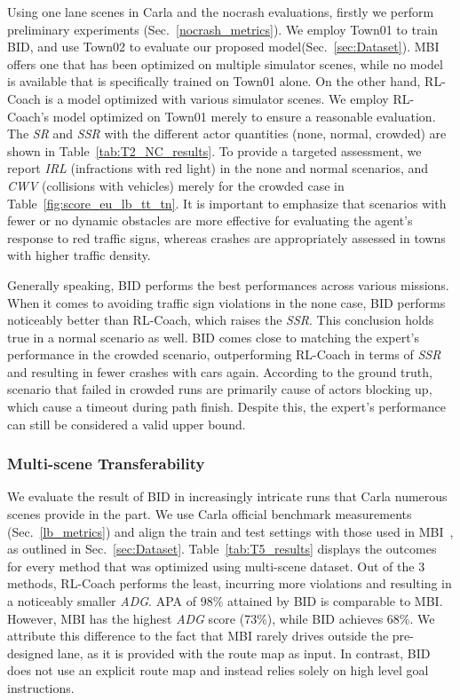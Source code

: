 \hspace{1pc}Using one lane scenes in Carla and  the nocrash evaluations, firstly we perform preliminary experiments (Sec.~\ref{nocrash_metrics}). 
We employ Town01 to train BID, and use Town02 to evaluate our proposed model(Sec.~\ref{sec:Dataset}). 
MBI offers one that has been optimized on multiple simulator scenes, while no model is available that is specifically trained on Town01 alone. 
On the other hand, RL-Coach is a model optimized with various simulator scenes. 
We employ RL-Coach's model optimized on Town01 merely to ensure a reasonable evaluation. 
The \emph{SR} and \emph{SSR} with the different actor quantities (none, normal, crowded) are shown in Table~\ref{tab:T2_NC_results}. 
To provide a targeted assessment, we report \emph{IRL} (infractions with red light) in the none and normal scenarios, and \emph{CWV} (collisions with vehicles) merely for the crowded case in Table~\ref{fig:score_eu_lb_tt_tn}. 
It is important to emphasize that scenarios with fewer or no dynamic obstacles are more effective for evaluating the agent's response to red traffic signs, whereas crashes are appropriately assessed in towns with higher traffic density.


Generally speaking, BID performs the best performances across various missions. 
When it comes to avoiding traffic sign violations in the none case, BID performs noticeably better than RL-Coach, which raises the \emph{SSR}.
This conclusion holds true in a normal scenario as well. 
BID comes close to matching the expert's performance in the crowded scenario, outperforming RL-Coach in terms of \emph{SSR} and resulting in fewer crashes with cars again. 
According to the ground truth, scenario that failed in crowded runs are primarily cause of actors blocking up, which cause a timeout during path finish. 
Despite this, the expert's performance can still be considered a valid upper bound.


\subsubsection{Multi-scene Transferability}\label{sec:multi_towns_result}
\hspace{1pc}We evaluate the result of BID in increasingly intricate runs that Carla numerous scenes provide in the part. 
We use Carla official benchmark measurements (Sec.~\ref{lb_metrics}) and align the train and test settings with those used in MBI~\cite{Hu:2022}, as outlined in Sec.~\ref{sec:Dataset}. 
Table~\ref{tab:T5_results} displays the outcomes for every method that was optimized using multi-scene dataset. 
Out of the 3 methods, RL-Coach performs the least, incurring more violations and resulting in a noticeably smaller \emph{ADG}. 
APA of 98\% attained by BID is comparable to MBI. 
However, MBI has the highest \emph{ADG} score (73\%), while BID achieves 68\%. 
We attribute this difference to the fact that MBI rarely drives outside the pre-designed lane, as it is provided with the route map as input. 
In contrast, BID does not use an explicit route map and instead relies solely on high level  goal instructions.


